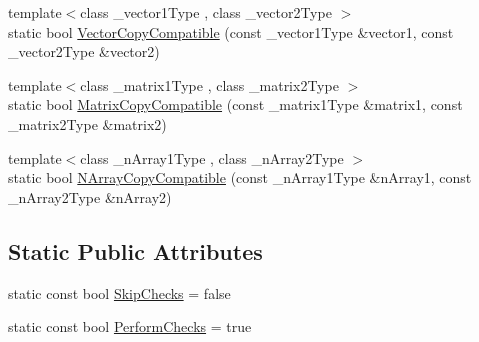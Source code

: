 \begin{DoxyCompactItemize}
\item 
{\footnotesize template$<$class \-\_\-vector1\-Type , class \-\_\-vector2\-Type $>$ }\\static bool \hyperlink{classvct_fast_copy_aa1da9b44b0f868dccb51cc804132e8f0}{Vector\-Copy\-Compatible} (const \-\_\-vector1\-Type \&vector1, const \-\_\-vector2\-Type \&vector2)
\item 
{\footnotesize template$<$class \-\_\-matrix1\-Type , class \-\_\-matrix2\-Type $>$ }\\static bool \hyperlink{classvct_fast_copy_a7139a17496805c6cf30b7b45d55c63cb}{Matrix\-Copy\-Compatible} (const \-\_\-matrix1\-Type \&matrix1, const \-\_\-matrix2\-Type \&matrix2)
\item 
{\footnotesize template$<$class \-\_\-n\-Array1\-Type , class \-\_\-n\-Array2\-Type $>$ }\\static bool \hyperlink{classvct_fast_copy_a4f5220d0ae7271941acea5a622dd0407}{N\-Array\-Copy\-Compatible} (const \-\_\-n\-Array1\-Type \&n\-Array1, const \-\_\-n\-Array2\-Type \&n\-Array2)
\end{DoxyCompactItemize}

\subsection*{Static Public Attributes}
{\bf }\par
\begin{DoxyCompactItemize}
\item 
static const bool \hyperlink{classvct_fast_copy_a221c1b0117c8dcf51332ad84f4e0fda5}{Skip\-Checks} = false
\item 
static const bool \hyperlink{classvct_fast_copy_af2981ae09904d1a4dd9b2d19c86c6cd9}{Perform\-Checks} = true
\end{DoxyCompactItemize}

